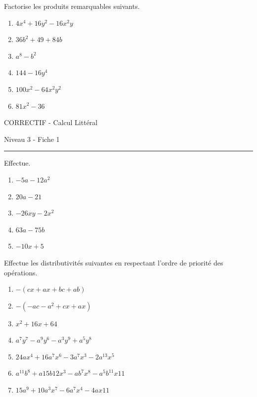 \documentclass[12pt,parskip=half-, twoside=semi]{scrartcl}
\begin{document}
\begin{exercise}Factorise les produits remarquables suivants.
  \begin{enumerate}[cols=3]
    \item $4 x^4+16 y^2-16 x^2 y$
    \item $36 b^2+49+84 b$
    \item $a^8-b^2$
    \item $144-16 y^4$
    \item $100 x^2-64 x^2 y^2$
    \item $81 x^2-36$
  \end{enumerate}
\end{exercise}


\begin{center}
  \bfseries
  \begin{Huge}
    CORRECTIF - Calcul Littéral
  \end{Huge}
  \smallbreak
  \begin{large}
    Niveau 3  - Fiche 1
  \end{large}
  \smallbreak
  \rule[10pt]{.5\linewidth}{1 pt}
\end{center}

\setcounter{exercise}{0}


\begin{exercise}Effectue.
  \begin{enumerate}[cols=2]
    \item $-5a-12a^2$
    \item $20a-21$
    \item $-26xy-2x^2$
    \item $63a-75b$
    \item $-10x+5$
  \end{enumerate}
\end{exercise}

\begin{exercise}Effectue les distributivités suivantes en respectant l'ordre de priorité des opérations.
  \begin{enumerate}[cols=2]
     \item $-(cx+ax+bc+ab)$
     \item $-(-ac-a^2+cx+ax)$
     \item $x^2+16x+64$
     \item $a^7y^7-a^9y^6-a^3y^9+a^5y^8$
     \item $24ax^4+16a^7x^6-3a^7x^3-2a^{13}x^5$
     \item $a^{11}b^8+a{15}b{12}x^3-ab^7x^8-a^5b^{11}x{11}$
     \item $15a^9+10a^3x^7-6a^7x^4-4ax{11}$
  \end{enumerate}
\end{exercise}
\end{document}

